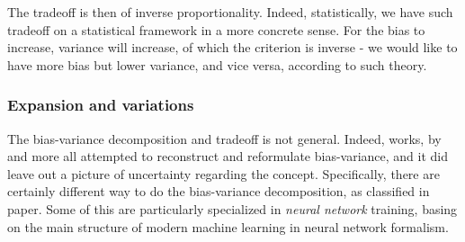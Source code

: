 \documentclass[
  journal=largetwo,
  year=2025,
  volume=37,
]{cup-journal}
\begin{document}
The tradeoff is then of inverse proportionality. Indeed, statistically, we have such tradeoff on a statistical framework in a more concrete sense. For the bias to increase, variance will increase, of which the criterion is inverse - we would like to have more bias but lower variance, and vice versa, according to such theory.

\subsubsection{Expansion and variations}

The bias-variance decomposition and tradeoff is not general. Indeed, works, by \cite{6797087,sharma_bias-variance_2014,domingos_unifeid_2000,adlam2020understandingdoubledescentrequires,yang_rethinking_2020} and more all attempted to reconstruct and reformulate bias-variance, and it did leave out a picture of uncertainty regarding the concept. Specifically, there are certainly different way to do the bias-variance decomposition, as classified in \cite{adlam2020understandingdoubledescentrequires} paper. Some of this are particularly specialized in \textit{neural network} training, basing on the main structure of modern machine learning in neural network formalism. 
\end{document}
